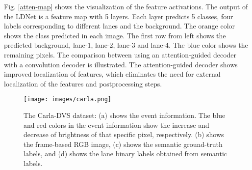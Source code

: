 \documentclass[journal]{IEEEtran}
\begin{document}
\begin{table}[t]
\centering
\caption{Quantitative analysis of LDNet with different backbone networks. The experimental analysis is performed on both the multiclass and binary-class tasks and the results are evaluated in terms of the mean  and  scores.}
\label{table 3}
\end{table}
Fig. \ref{atten-map} shows the visualization of the feature activations. The output of the LDNet is a feature map with 5 layers. Each layer predicts 5 classes, four labels corresponding to different lanes and the background. The orange color shows the class predicted in each image. The first row from left shows the predicted background, lane-1, lane-2, lane-3 and lane-4. The blue color shows the remaining pixels.  
The comparison between using an attention-guided decoder with a convolution decoder is illustrated. The attention-guided decoder shows improved localization of features, which eliminates the need for external localization of the features and postprocessing steps.

\begin{figure}[t]
      \centering
      \texttt{[image: images/carla.png]}
\caption{The Carla-DVS dataset: (a) shows the event information. The blue and red colors in the event information show the increase and decrease of brightness of that specific pixel, respectively. (b) shows the frame-based RGB image, (c) shows the semantic ground-truth labels, and (d) shows the lane binary labels obtained from semantic labels.  } 
      \label{carla}
\end{figure}
\end{document}
